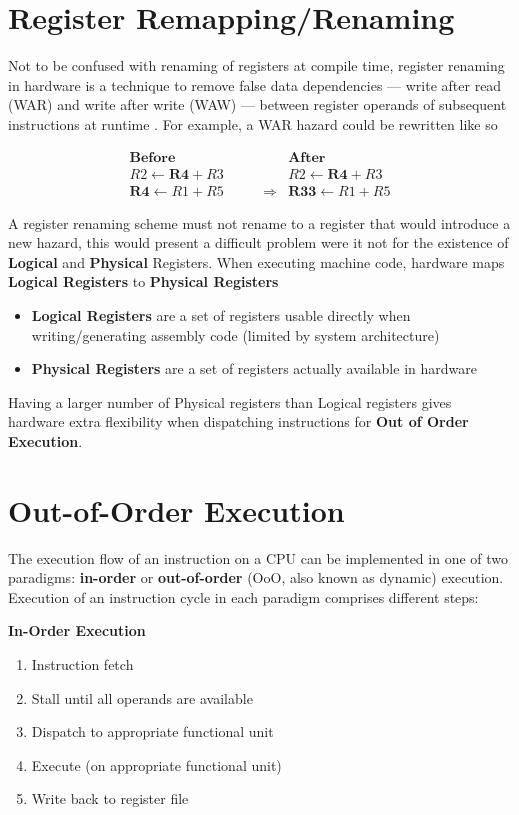 \documentclass[12pt]{report}
\begin{document}
\section{Register Remapping/Renaming}
\label{sec:orgb105dfd}
Not to be confused with renaming of registers at compile time, register
renaming in hardware is a technique to remove false data dependencies ---
write after read (WAR) and write after write (WAW) --- between register
operands of subsequent instructions at runtime \parencite{sima2000design}.
For example, a WAR hazard could be rewritten like so

\begin{align*}
\textbf{Before}                   & \qquad &                 \textbf{After} \\
R2 \leftarrow \textbf{R4} + R3    & \qquad &                 R2 \leftarrow \textbf{R4} + R3 \\
\textbf{R4} \leftarrow R1 + R5    & \qquad \Longrightarrow & \textbf{R33} \leftarrow R1 + R5
\end{align*}

A register renaming scheme must not rename to a register that would introduce
a new hazard, this would present a difficult problem were it not for the
existence of \textbf{Logical} and \textbf{Physical} Registers. When executing machine code,
hardware maps \textbf{Logical Registers} to \textbf{Physical Registers}
\begin{itemize}
\item \textbf{Logical Registers} are a set of registers usable directly when
writing/generating assembly code (limited by system architecture)
\item \textbf{Physical Registers} are a set of registers actually available in hardware
\end{itemize}
Having a larger number of Physical registers than Logical registers gives
hardware extra flexibility when dispatching instructions for \textbf{Out of Order Execution}.

\section{Out-of-Order Execution}
\label{sec:org3789d29}

The execution flow of an instruction on a CPU can be implemented in one of
two paradigms: \textbf{in-order} or \textbf{out-of-order} (OoO, also known as dynamic)
execution. Execution of an instruction cycle in each paradigm comprises
different steps:

\textbf{In-Order Execution}
\begin{enumerate}
\item Instruction fetch
\item Stall until all operands are available
\item Dispatch to appropriate functional unit
\item Execute (on appropriate functional unit)
\item Write back to register file
\end{enumerate}
\end{document}
